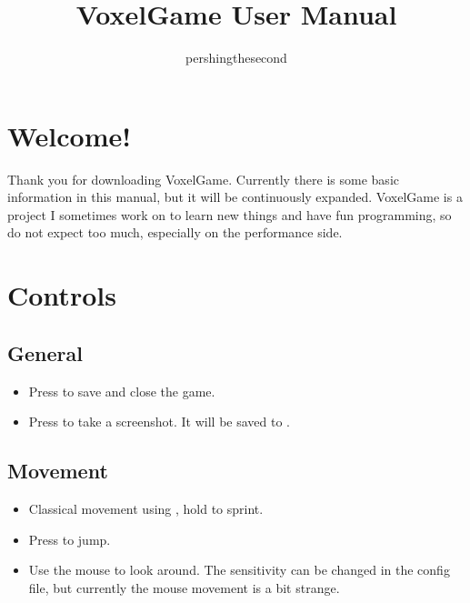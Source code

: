 \documentclass{article}
\begin{document}
    \title{VoxelGame User Manual}
    \author{pershingthesecond}

    \maketitle


    \section{Welcome!}\label{sec:welcome!}

    Thank you for downloading VoxelGame.
    Currently there is some basic information in this manual, but it will be continuously expanded.
    VoxelGame is a project I sometimes work on to learn new things and have fun programming, so do not expect too much, especially on the performance side.


    \section{Controls}\label{sec:controls}

    \subsection{General}\label{subsec:general}
    \begin{itemize}
        \item Press \keys{\esc} to save and close the game.
        \item Press  to take a screenshot. It will be saved to .
    \end{itemize}

    \subsection{Movement}\label{subsec:movement}
    \begin{itemize}
        \item Classical movement using , hold \keys{\shift} to sprint.
        \item Press \keys{\SPACE} to jump.
        \item Use the mouse to look around. The sensitivity can be changed in the config file, but currently the mouse movement is a bit strange.
    \end{itemize}
\end{document}
